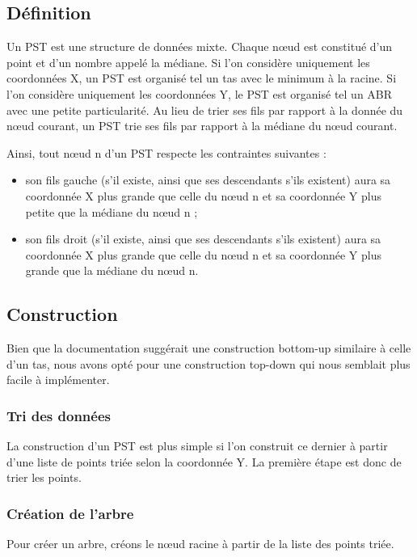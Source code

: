 \documentclass[10pt,a4paper]{article}
\begin{document}
\subsection{Définition}
Un PST est une structure de données mixte. Chaque nœud est constitué d'un point et d'un nombre appelé la médiane. Si l'on considère uniquement les coordonnées X, un PST est organisé tel un tas avec le minimum à la racine. Si l'on considère uniquement les coordonnées Y, le PST est organisé tel un ABR avec une petite particularité. Au lieu de trier ses fils par rapport à la donnée du nœud courant, un PST trie ses fils par rapport à la médiane du nœud courant.

Ainsi, tout nœud n d'un PST respecte les contraintes suivantes :
\begin{itemize}
	\item son fils gauche (s'il existe, ainsi que ses descendants s'ils existent) aura sa coordonnée X plus grande que celle du nœud n et sa coordonnée Y plus petite que la médiane du nœud n ;
	\item son fils droit (s'il existe, ainsi que ses descendants s'ils existent) aura sa coordonnée X plus grande que celle du nœud n et sa coordonnée Y plus grande que la médiane du nœud n.
\end{itemize}

\subsection{Construction}
Bien que la documentation suggérait une construction bottom-up similaire à celle d'un tas, nous avons opté pour une construction top-down qui nous semblait plus facile à implémenter.

\subsubsection{Tri des données}
La construction d'un PST est plus simple si l'on construit ce dernier à partir d'une liste de points triée selon la coordonnée Y. La première étape est donc de trier les points.

\subsubsection{Création de l'arbre}
Pour créer un arbre, créons le nœud racine à partir de la liste des points triée.
\end{document}
